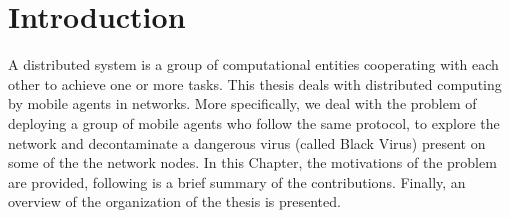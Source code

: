 \chapter {Introduction}
\label{INTRO}

  A distributed system is a group of computational entities cooperating with each other to achieve one or more tasks. This thesis deals with distributed computing by mobile agents in networks. More specifically, we deal with the problem of deploying a group of mobile agents who follow the same protocol,  to explore the network and decontaminate a dangerous virus (called Black Virus) present on some of the the network nodes.
  In this Chapter, the motivations of the problem are provided, following is a brief summary of the contributions. 
  Finally, an overview of the organization of the thesis is presented.


